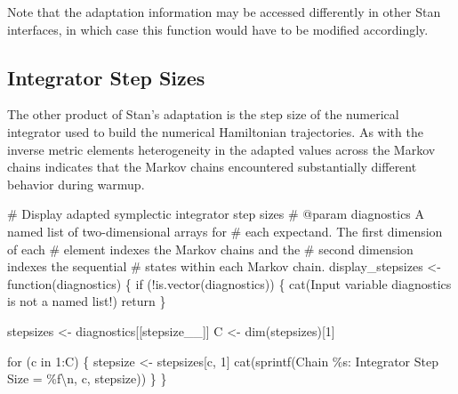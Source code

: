 \documentclass[
  letterpaper,
  DIV=11,
  numbers=noendperiod]{scrartcl}
\newenvironment{Shaded}{\begin{snugshade}}{\end{snugshade}}
\newcommand{\CommentTok}[1]{\textcolor[rgb]{0.37,0.37,0.37}{#1}}
\newcommand{\ControlFlowTok}[1]{\textcolor[rgb]{0.00,0.23,0.31}{#1}}
\newcommand{\DecValTok}[1]{\textcolor[rgb]{0.68,0.00,0.00}{#1}}
\newcommand{\FunctionTok}[1]{\textcolor[rgb]{0.28,0.35,0.67}{#1}}
\newcommand{\NormalTok}[1]{\textcolor[rgb]{0.00,0.23,0.31}{#1}}
\newcommand{\OtherTok}[1]{\textcolor[rgb]{0.00,0.23,0.31}{#1}}
\newcommand{\SpecialCharTok}[1]{\textcolor[rgb]{0.37,0.37,0.37}{#1}}
\newcommand{\StringTok}[1]{\textcolor[rgb]{0.13,0.47,0.30}{#1}}
\begin{document}
Note that the adaptation information may be accessed differently in
other Stan interfaces, in which case this function would have to be
modified accordingly.

\hypertarget{integrator-step-sizes}{%
\subsection{Integrator Step Sizes}\label{integrator-step-sizes}}

The other product of Stan's adaptation is the step size of the numerical
integrator used to build the numerical Hamiltonian trajectories. As with
the inverse metric elements heterogeneity in the adapted values across
the Markov chains indicates that the Markov chains encountered
substantially different behavior during warmup.

\begin{Shaded}
\begin{Highlighting}[]
\CommentTok{\# Display adapted symplectic integrator step sizes}
\CommentTok{\# @param diagnostics A named list of two{-}dimensional arrays for }
\CommentTok{\#                    each expectand.  The first dimension of each}
\CommentTok{\#                    element indexes the Markov chains and the }
\CommentTok{\#                    second dimension indexes the sequential }
\CommentTok{\#                    states within each Markov chain.}
\NormalTok{display\_stepsizes }\OtherTok{\textless{}{-}} \ControlFlowTok{function}\NormalTok{(diagnostics) \{}
  \ControlFlowTok{if}\NormalTok{ (}\SpecialCharTok{!}\FunctionTok{is.vector}\NormalTok{(diagnostics)) \{}
    \FunctionTok{cat}\NormalTok{(}\StringTok{\textquotesingle{}Input variable \textasciigrave{}diagnostics\textasciigrave{} is not a named list!\textquotesingle{}}\NormalTok{)}
\NormalTok{    return}
\NormalTok{  \}}
  
\NormalTok{  stepsizes }\OtherTok{\textless{}{-}}\NormalTok{ diagnostics[[}\StringTok{\textquotesingle{}stepsize\_\_\textquotesingle{}}\NormalTok{]]}
\NormalTok{  C }\OtherTok{\textless{}{-}} \FunctionTok{dim}\NormalTok{(stepsizes)[}\DecValTok{1}\NormalTok{]}
  
  \ControlFlowTok{for}\NormalTok{ (c }\ControlFlowTok{in} \DecValTok{1}\SpecialCharTok{:}\NormalTok{C) \{}
\NormalTok{    stepsize }\OtherTok{\textless{}{-}}\NormalTok{ stepsizes[c, }\DecValTok{1}\NormalTok{]}
    \FunctionTok{cat}\NormalTok{(}\FunctionTok{sprintf}\NormalTok{(}\StringTok{\textquotesingle{}Chain \%s: Integrator Step Size = \%f}\SpecialCharTok{\textbackslash{}n}\StringTok{\textquotesingle{}}\NormalTok{,}
\NormalTok{                c, stepsize))}
\NormalTok{  \}}
\NormalTok{\}}
\end{Highlighting}
\end{Shaded}
\end{document}
